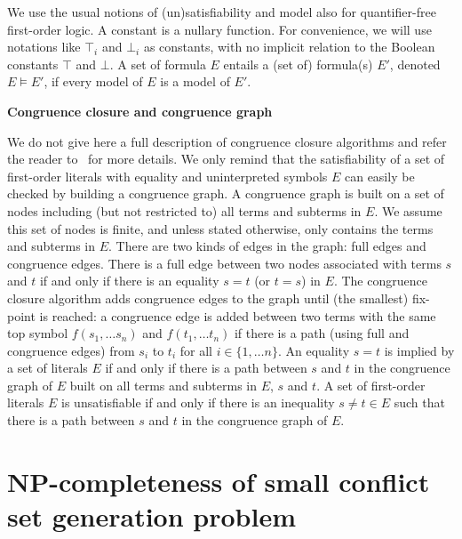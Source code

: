 \documentclass{easychair}
\begin{document}
We use the usual notions of (un)satisfiability and model also for
quantifier-free first-order logic.  A constant is a nullary function.  For
convenience, we will use notations like $\top_i$ and $\bot_i$ as constants, with
no implicit relation to the Boolean constants $\top$ and $\bot$.  A set of
formula $E$ entails a (set of) formula(s) $E'$, denoted $E\models E'$, if every
model of $E$ is a model of $E'$.

\vspace*{5pt}
\noindent \textbf{Congruence closure and congruence graph}

\noindent
We do not give here a full description of congruence closure algorithms and
refer the reader to~\cite{Nelson2,Downey1,Nieuwenhuis6} for more details.  We
only remind that the satisfiability of a set of first-order literals with
equality and uninterpreted symbols $E$ can easily be checked by building a
congruence graph.  A congruence graph is built on a set of nodes including (but
not restricted to) all terms and subterms in $E$.  We assume this set of nodes
is finite, and unless stated otherwise, only contains the terms and subterms in
$E$.  There are two kinds of edges in the graph: full edges and congruence
edges.  There is a full edge between two nodes associated with terms $s$ and $t$
if and only if there is an equality $s=t$ (or $t=s$) in $E$.  The congruence
closure algorithm adds congruence edges to the graph until (the smallest)
fix-point is reached: a congruence edge is added between two terms with the same
top symbol $f(s_1, \dots s_n)$ and $f(t_1, \dots t_n)$ if there is a path (using
full and congruence edges) from $s_i$ to $t_i$ for all $i\in \{1,\dots n\}$.  An
equality $s=t$ is implied by a set of literals $E$ if and only if there is a
path between $s$ and $t$ in the congruence graph of $E$ built on all terms and
subterms in $E$, $s$ and $t$.  A set of first-order literals $E$ is
unsatisfiable if and only if there is an inequality $s\neq t \in E$ such that
there is a path between $s$ and $t$ in the congruence graph of $E$.

\section*{NP-completeness of small conflict set generation problem}
\label{sec:npcomplete}
\end{document}
